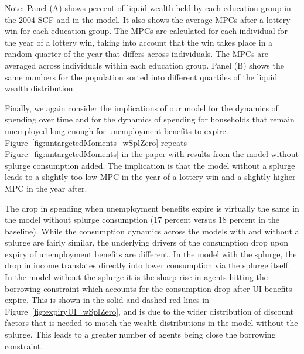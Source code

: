 \documentclass[qe]{econsocart}
\begin{document}
\begin{table}[tb]
  \noindent\parbox{\textwidth}{
    \medskip
    \footnotesize Note: Panel (A) shows percent of liquid wealth held by each education group in the 2004 SCF and in the model. It also shows the average MPCs after a lottery win for each education group. The MPCs are calculated for each individual for the year of a lottery win, taking into account that the win takes place in a random quarter of the year that differs across individuals. The MPCs are averaged across individuals within each education group. Panel (B) shows the same numbers for the population sorted into different quartiles of the liquid wealth distribution.
  }
\end{table}

Finally, we again consider the  implications of our model for the dynamics of spending over time and for the dynamics of spending for households that remain unemployed long enough for unemployment benefits to expire. Figure~\ref{fig:untargetedMoments_wSplZero} repeats Figure~\ref{fig:untargetedMoments} in the paper with results from the model without splurge consumption added. The implication is that the model without a splurge leads to a slightly too low MPC in the year of a lottery win and a slightly higher MPC in the year after.

The drop in spending when unemployment benefits expire is virtually the same in the model without splurge consumption (17 percent versus 18 percent in the baseline).
While the consumption dynamics across the models with and without a splurge are fairly similar, the underlying drivers of the consumption drop upon expiry of unemployment benefits are different.
In the model with the splurge, the drop in income translates directly into lower consumption via the splurge itself.
In the model without the splurge it is the sharp rise in agents hitting the borrowing constraint which accounts for the consumption drop after UI benefits expire.
This is shown in the solid and dashed red lines in Figure~\ref{fig:expiryUI_wSplZero}, and is due to the wider distribution of discount factors that is needed to match the wealth distributions in the model without the splurge. This leads to a greater number of agents being close the borrowing constraint.
\end{document}
